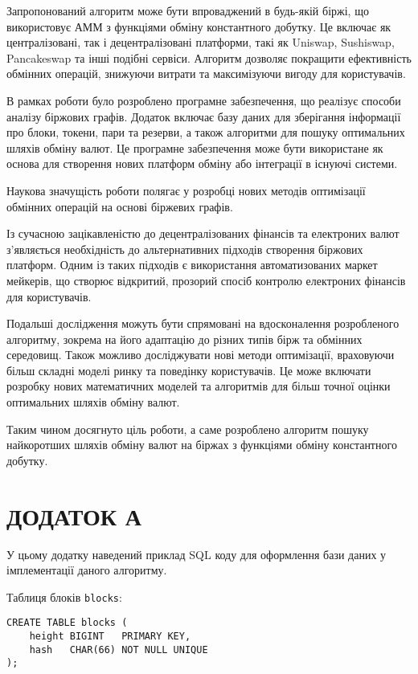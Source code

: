 \documentclass[14pt]{extarticle}
\begin{document}
Запропонований алгоритм може бути впроваджений в будь-якій біржі, що
використовує АММ з функціями обміну константного добутку. Це включає як
централізовані, так і децентралізовані платформи, такі як Uniswap, Sushiswap,
Pancakeswap та інші подібні сервіси. Алгоритм дозволяє покращити ефективність
обмінних операцій, знижуючи витрати та максимізуючи вигоду для користувачів.

В рамках роботи було розроблено програмне забезпечення, що реалізує способи
аналізу біржових графів. Додаток включає базу даних для зберігання інформації про
блоки, токени, пари та резерви, а також алгоритми для пошуку оптимальних шляхів
обміну валют. Це програмне забезпечення може бути використане як основа для
створення нових платформ обміну або інтеграції в існуючі системи.

Наукова значущість роботи полягає у розробці нових методів оптимізації обмінних
операцій на основі біржевих графів.

Із сучасною зацікавленістю до децентралізованих фінансів та електроних валют
з'являється необхідність до альтернативних підходів створення біржових платформ.
Одним із таких підходів є використання автоматизованих маркет мейкерів, що
створює відкритий, прозорий спосіб контролю електроних фінансів для
користувачів.

Подальші дослідження можуть бути спрямовані на вдосконалення розробленого
алгоритму, зокрема на його адаптацію до різних типів бірж та обмінних середовищ.
Також можливо досліджувати нові методи оптимізації, враховуючи більш складні
моделі ринку та поведінку користувачів. Це може включати розробку нових
математичних моделей та алгоритмів для більш точної оцінки оптимальних шляхів
обміну валют.

Таким чином досягнуто ціль роботи, а саме розроблено алгоритм пошуку найкоротших
шляхів обміну валют на біржах з функціями обміну константного добутку.

\newpage

\printbibliography{}
\newpage

\section{ДОДАТОК А}\label{sec:addition-a}

У цьому додатку наведений приклад SQL коду для оформлення бази даних у
імплементації даного алгоритму.

Таблиця блоків \texttt{blocks}:

\begin{verbatim}
CREATE TABLE blocks (
    height BIGINT   PRIMARY KEY,
    hash   CHAR(66) NOT NULL UNIQUE
);
\end{verbatim}
\end{document}
